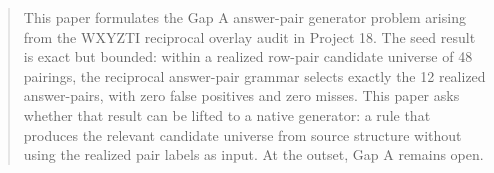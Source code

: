 \begin{abstract}
This paper formulates the Gap A answer-pair generator problem arising from the WXYZTI reciprocal overlay audit in Project 18. The seed result is exact but bounded: within a realized row-pair candidate universe of 48 pairings, the reciprocal answer-pair grammar selects exactly the 12 realized answer-pairs, with zero false positives and zero misses. This paper asks whether that result can be lifted to a native generator: a rule that produces the relevant candidate universe from source structure without using the realized pair labels as input. At the outset, Gap A remains open.
\end{abstract}
